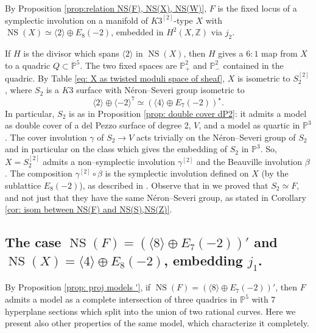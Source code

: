 \documentclass{amsart}
\theoremstyle{definition}
\numberwithin{equation}{section}
\numberwithin{equation}{section} \theoremstyle{definition}
\DeclareMathOperator{\NS}{NS}
\newcommand{\ra}{\rightarrow}
\newcommand\Z{\mathbb{Z}}
\begin{document}
By Proposition \ref{prop:relation NS(F), NS(X), NS(W)}, $F$ is the fixed locus of a symplectic involution on a manifold of $K3^{[2]}$-type $X$ with $\NS(X)\simeq \langle 2\rangle\oplus E_8(-2)$, embedded in $H^2(X,\Z)$ via $j_2$.

If $H$ is the divisor which spans $\langle 2 \rangle$ in $\NS(X)$, then $H$ gives a $6:1$ map from $X$ to a quadric  $Q\subset \mathbb{P}^5$. The two fixed spaces are $\mathbb{P}^2_{+}$ and $\mathbb{P}^2_{-}$ contained in the quadric. 
By Table \eqref{eq: X as twisted moduli space of sheaf}, $X$ is isometric to $S_2^{[2]}$, where $S_2$ is a $K3$ surface with N\'eron--Severi group isometric to $$ \langle 2\rangle \oplus \langle -2\rangle^7\simeq \left(\langle 4\rangle\oplus E_7(-2)\right)^\star.$$ In particular, $S_2$ is as in Proposition \ref{prop: double cover dP2}: it admits a model as double cover of a del Pezzo surface of degree 2, $V$, and a model as quartic in $\mathbb{P}^3$. The cover involution $\gamma$ of $S_2\ra V$ acts trivially on the N\'eron--Severi group of $S_2$ and in particular on the class which gives the embedding of $S_2$ in $\mathbb{P}^3$. So, $X=S_2^{[2]}$ admits a non--symplectic involution $\gamma^{[2]}$ and the Beauville involution $\beta$. The composition $\gamma^{[2]}\circ \beta$ is the symplectic involution defined on $X$ (by the sublattice $E_8(-2)$), as described in \cite[Proposition 3.14]{CGKK}. Observe that in \cite[Proposition 3.14]{CGKK} we proved that $S_2\simeq F$, and not just that they have the same N\'eron--Severi group, as stated in Corollary \ref{cor: isom between NS(F) and NS(S),NS(Z)}.



\subsection{The case $\NS(F)=\left(\langle 8\rangle\oplus E_7(-2)\right)'$ and $\NS(X)=\langle 4\rangle\oplus E_8(-2)$, embedding $j_1$.}\label{subsec:d=4,j1} By Proposition \ref{prop: proj models '}, if $\NS(F)=\left(\langle 8\rangle\oplus E_7(-2)\right)'$, then $F$ admits a model as a complete intersection of three quadrics in $\mathbb{P}^5$ with 7 hyperplane sections which split into the union of two rational curves. Here we present also other properties of the same model, which characterize it completely.
\end{document}
